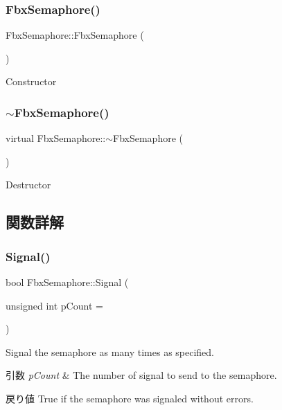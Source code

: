 \subsubsection{\texorpdfstring{Fbx\+Semaphore()}{FbxSemaphore()}}
{\footnotesize\ttfamily Fbx\+Semaphore\+::\+Fbx\+Semaphore (\begin{DoxyParamCaption}{ }\end{DoxyParamCaption})}



Constructor 

\mbox{\label{class_fbx_semaphore_aea00e26f6b9452107104eaf2f2e49f1b}} 
\subsubsection{\texorpdfstring{$\sim$\+Fbx\+Semaphore()}{~FbxSemaphore()}}
{\footnotesize\ttfamily virtual Fbx\+Semaphore\+::$\sim$\+Fbx\+Semaphore (\begin{DoxyParamCaption}{ }\end{DoxyParamCaption})\hspace{0.3cm}{\ttfamily [virtual]}}



Destructor 



\subsection{関数詳解}
\mbox{\label{class_fbx_semaphore_a56bdff92c29ea31a57003f207e52c672}} 
\subsubsection{\texorpdfstring{Signal()}{Signal()}}
{\footnotesize\ttfamily bool Fbx\+Semaphore\+::\+Signal (\begin{DoxyParamCaption}\item[{unsigned int}]{p\+Count = {} }\end{DoxyParamCaption})}

Signal the semaphore as many times as specified. 
\begin{DoxyParams}{引数}
{\em p\+Count} & The number of signal to send to the semaphore. \\
\hline
\end{DoxyParams}
\begin{DoxyReturn}{戻り値}
True if the semaphore was signaled without errors. 
\end{DoxyReturn}
\mbox{\label{class_fbx_semaphore_a05d7cdaa49c89691f22a26851be1f885}} 
